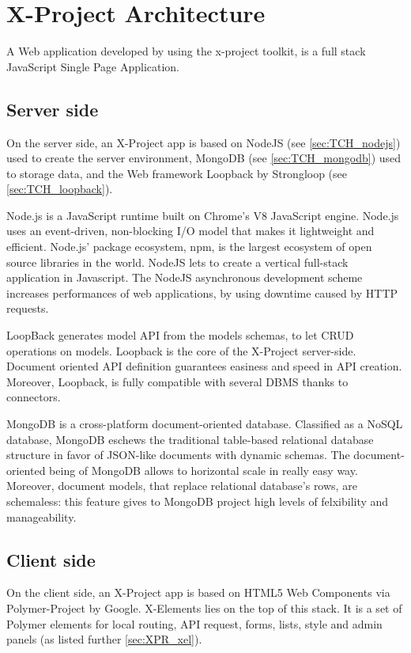 \section{X-Project Architecture}
\label{sec:XPR_arc}

A Web application developed by using the x-project toolkit, is a full stack JavaScript Single Page Application.

\subsection{Server side}
\label{subsec:XPR_arc_serv}

On the server side, an X-Project app is based on NodeJS (see \ref{sec:TCH_nodejs}) used to create the server environment, MongoDB (see \ref{sec:TCH_mongodb}) used to storage data, and the Web framework Loopback by Strongloop (see \ref{sec:TCH_loopback}).

Node.js is a JavaScript runtime built on Chrome's V8 JavaScript engine. Node.js uses an event-driven, non-blocking I/O model that makes it lightweight and efficient. Node.js' package ecosystem, npm, is the largest ecosystem of open source libraries in the world. 
NodeJS lets to create a vertical full-stack application in Javascript. The NodeJS asynchronous development scheme increases performances of web applications, by using downtime caused by HTTP requests.

LoopBack generates model API from the models schemas, to let CRUD operations on models.
Loopback is the core of the X-Project server-side. Document oriented API definition guarantees easiness and speed in API creation. Moreover, Loopback, is fully compatible with several DBMS thanks to connectors. 

MongoDB is a cross-platform document-oriented database. Classified as a NoSQL database, MongoDB eschews the traditional table-based relational database structure in favor of JSON-like documents with dynamic schemas.
The document-oriented being of MongoDB allows to horizontal scale in really easy way. Moreover, document models, that replace relational database's rows, are schemaless: this feature gives to MongoDB project high levels of felxibility and manageability.


\subsection{Client side}
\label{subsec:XPR_arc_clie}

On the client side, an X-Project app is based on HTML5 Web Components via Polymer-Project by Google.
X-Elements lies on the top of this stack. It is a set of Polymer elements for local routing, API request, forms, lists, style and admin panels (as listed further \ref{sec:XPR_xel}).

